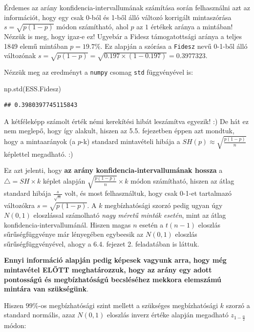 \documentclass[
]{book}
\newenvironment{Shaded}{\begin{snugshade}}{\end{snugshade}}
\newcommand{\NormalTok}[1]{#1}
\begin{document}
Érdemes az arány konfidencia-intervallumának számítása során felhasználni azt az információt, hogy egy csak 0-ból és 1-ből álló változó korrigált mintaszórása \(s=\sqrt{p(1-p)}\) módon számítható, ahol \(p\) az \(1\) értékek aránya a mintában!
Nézzük is meg, hogy igaz-e ez! Ugyebár a Fidesz támogatottsági aránya a teljes 1849 elemű mintában \(p=19.7\%\). Ez alapján a szórása a \texttt{Fidesz} nevű 0-1-ből álló változónak \(s=\sqrt{p(1-p)}=\sqrt{0.197 \times (1-0.197)}=0.3977323\).

Nézzük meg az eredményt a \texttt{numpy} csomag \texttt{std} függvényével is:

\begin{Shaded}
\begin{Highlighting}[]
\NormalTok{np.std(ESS.Fidesz)}
\end{Highlighting}
\end{Shaded}

\begin{verbatim}
## 0.3980397745115843
\end{verbatim}

A kétféleképp számolt érték némi kerekítési hibát leszámítva egyezik! :) De hát ez nem meglepő, hogy így alakult, hiszen az 5.5. fejezetben éppen azt mondtuk, hogy a mintaarányok (a \(p\)-k) standard mintavételi hibája a \(SH(p) \approx \sqrt{\frac{p(1-p)}{n}}\) képlettel megadható. :)

Ez azt jelenti, hogy \textbf{az arány konfidencia-intervallumának hossza} a \(\triangle = SH \times k\) képlet alapján \(\sqrt{\frac{p(1-p)}{n}} \times k\) módon számítható, hiszen az átlag standard hibája \(\frac{s}{\sqrt{n}}\) volt, és most felhasználtuk, hogy csak 0-1-et tartalmazó változókra \(s=\sqrt{p(1-p)}\). A \(k\) megbízhatósági szorzó pedig ugyan úgy \(N(0,1)\) eloszlással számolható \emph{nagy méretű minták esetén}, mint az átlag konfidencia-intervallumánál. Hiszen magas \(n\) esetén a \(t(n-1)\) eloszlás sűrűségfüggvénye már lényegében egybeesik az \(N(0,1)\) eloszlás sűrűségfüggvényével, ahogy a 6.4. fejezet 2. feladatában is láttuk.

\textbf{Ennyi információ alapján pedig képesek vagyunk arra, hogy még mintavétel ELŐTT meghatározzuk, hogy az arány egy adott pontosságú és megbízhatóságú becsléséhez mekkora elemszámú mintára van szükségünk}.

Hiszen \(99\%\)-os megbízhatósági szint mellett a szükséges megbízhatósági \(k\) szorzó a standard normális, azaz \(N(0,1)\) eloszlás inverz értéke alapján megadható \(z_{1-\frac{\alpha}{2}}\) módon:
\end{document}
